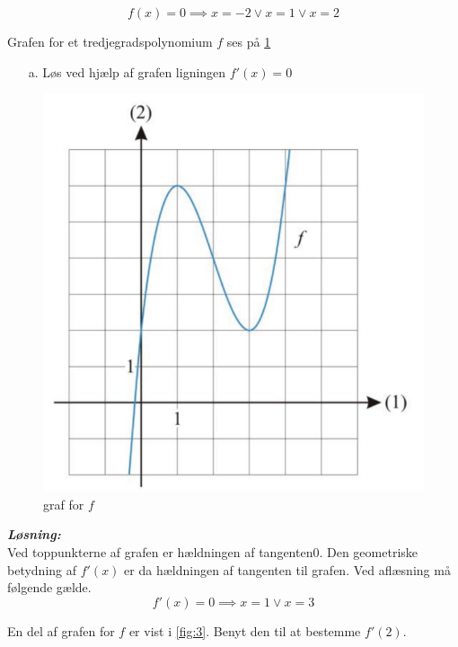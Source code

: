 \documentclass{article}
\newcommand{\sol}{\setlength{\parindent}{0cm}\textbf{\textit{Løsning:}}\setlength{\parindent}{1cm}}
\begin{document}
\[
f(x)=0 \implies x=-2 \lor x=1 \lor x=2
\] 
\pagebreak
\begin{question}{}{}
  Grafen for et tredjegradspolynomium $f$ ses på \cref{fig:2} 
\begin{itemize}
  \item[a.] Løs ved hjælp af grafen ligningen $f'(x)=0$ 
\end{itemize}
\end{question}
\begin{figure}[h]
\begin{center}
  \includegraphics[scale=0.5]{mat16.2.png}
\end{center}
\caption{graf for $f$}
\label{fig:2}
\end{figure}
\sol \\ 
Ved toppunkterne af grafen er hældningen af tangenten$0$. Den geometriske betydning af $f'(x)$ er da hældningen af tangenten til grafen. Ved aflæsning må følgende gælde.
\[
f'(x)=0 \implies x=1 \lor x=3
\] 
\pagebreak
\begin{question}{}{}
  En del af grafen for $f$ er vist i \cref{fig:3}. Benyt den til at bestemme $f'(2)$.
\end{question}
\end{document}
